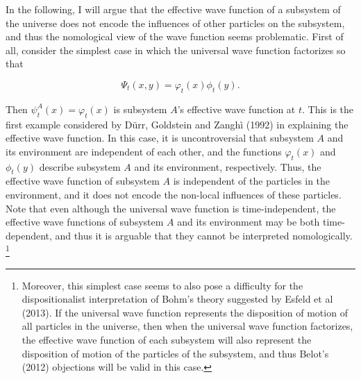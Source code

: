 In the following, I will argue that  the effective wave function of a subsystem of the universe does not encode the influences of other particles on the subsystem, and thus the nomological view of the wave function seems problematic. First of all, consider the simplest case in which the universal wave function factorizes so that

\begin{equation}
\Psi_t(x, y)=\varphi_t(x)\phi_t(y).
\end{equation}

\noindent Then $\psi_t^A(x)=\varphi_t(x)$ is subsystem $A$'s effective wave function at $t$. This is the first example considered by D\"{u}rr, Goldstein and Zangh\`{i} (1992) in explaining the effective wave function. In this case, it is uncontroversial that subsystem $A$ and its environment are independent of each other, and the functions $\varphi_t(x)$ and $\phi_t(y)$ describe subsystem $A$ and its environment, respectively. Thus, the effective wave function of subsystem $A$ is independent of the particles in the environment, and it does not encode the non-local influences of these particles. 
Note that even although the universal wave function is time-independent, the effective wave functions of subsystem $A$ and its environment may be both time-dependent, and thus it is arguable that they cannot be interpreted nomologically.%
\footnote{Moreover, this simplest case seems to also pose a difficulty for the dispositionalist interpretation of Bohm's theory suggested by Esfeld et al (2013). If the universal wave function represents the disposition of motion of all particles in the universe, then when the universal wave function factorizes, the effective wave function of each subsystem will also represent the disposition of motion of the particles of the subsystem, and thus Belot's (2012) objections will be valid in this case.}


